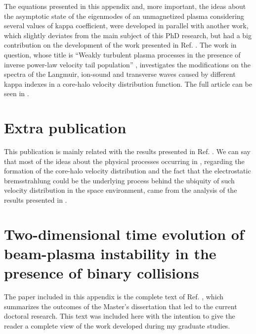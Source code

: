 \documentclass[12pt,a4paper,ruledheader]{report}
\begin{document}
\begin{appendix}
The equations presented in this appendix and, more important, the
ideas about the asymptotic state of the eigenmodes of an unmagnetized
plasma considering several values of kappa coefficient, were developed
in parallel with another work, which slightly deviates from the
main subject of this PhD research, but had a big contribution on the
development of the work presented in Ref. \cite{Tigik2017a}. 
The work in question, whose title
is ``Weakly turbulent plasma processes in the presence of inverse
power-law velocity tail population'' \cite{Tigik2017b}, investigates
the modifications on the spectra of the Langmuir, ion-sound and
transverse waves caused by different kappa indexes in a core-halo
velocity distribution function. The full article can be seen in
.


\chapter{Extra publication}
\label{appC}
This publication is mainly related with the results presented in
Ref. \cite{Tigik2017a}.
We can say that most of the ideas about the physical processes occurring
in \cite{Tigik2017a}, regarding the formation of the core-halo velocity
distribution and the fact that the electrostatic bremsstrahlung could be
the underlying process behind the ubiquity of such velocity distribution
in the space environment, came from the analysis of the results presented
in \cite{Tigik2017b}. 



\chapter{Two-dimensional time evolution of beam-plasma
  instability in the presence of binary collisions}
\label{master}
The paper included in this appendix is the complete text of Ref.
\cite{Tigik2016a}, which summarizes the outcomes of the Master's
dissertation \cite{Tigik2015} that led to the current doctoral
research. This text was included here with the intention to give
the reader a complete view of the work developed during my graduate
studies.






\end{appendix}
\end{document}
